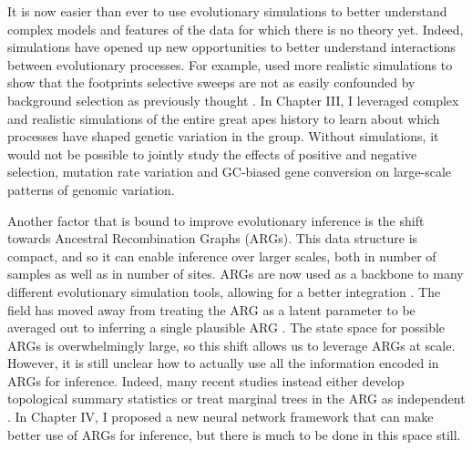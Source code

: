 %
It is now easier than ever to use evolutionary simulations to better understand complex models and features of the data for which there is no theory yet.
Indeed, simulations have opened up new opportunities to better understand interactions between evolutionary processes.
For example, \citet{schrider_background_2020} used more realistic simulations to show that the footprints selective sweeps are not as easily confounded by background selection as previously thought \citep{andolfatto_adaptive_2001}.
In Chapter III, I leveraged complex and realistic simulations of the entire great apes history to learn about which processes have shaped genetic variation in the group.
Without simulations, it would not be possible to jointly study the effects of positive and negative selection, mutation rate variation and GC-biased gene conversion on large-scale patterns of genomic variation.

Another factor that is bound to improve evolutionary inference is the shift towards Ancestral Recombination Graphs (ARGs).
This data structure is compact, and so it can enable inference over larger scales, both in number of samples as well as in number of sites.
ARGs are now used as a backbone to many different evolutionary simulation tools, allowing for a better integration \citep{haller_tree-sequence_2019, kelleher_efficient_2016-1}.
The field has moved away from treating the ARG as a latent parameter to be averaged out \citep{griffiths_ancestral_1996, nielsen_estimation_2000}
to inferring a single plausible ARG \citep{kelleher_inferring_2019, speidel_method_2019}.
The state space for possible ARGs is overwhelmingly large, so  this shift allows us to leverage ARGs at scale.
However, it is still unclear how to actually use all the information encoded in ARGs for inference.
Indeed, many recent studies instead either develop topological summary statistics or treat marginal trees in the ARG as independent \citep{hejase_deep-learning_2022, fan_likelihood-based_2023}.
In Chapter IV, I proposed a new neural network framework that can make better use of ARGs for inference,
but there is much to be done in this space still.


